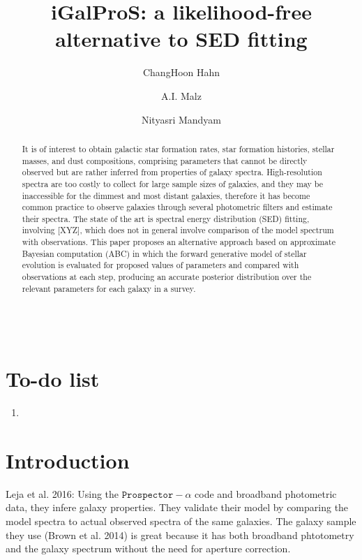 \documentclass[12pt, onecolumn]{emulateapj}
\begin{document}
\begin{align}
\end{align}

\title{iGalProS: a likelihood-free alternative to SED fitting}

\author{ChangHoon Hahn}
\author{A.I. Malz}
\author{Nityasri Mandyam}

\begin{abstract}
It is of interest to obtain galactic star formation rates, star formation histories, stellar masses, and dust compositions, comprising parameters that cannot be directly observed but are rather inferred from properties of galaxy spectra.  High-resolution spectra are too costly to collect for large sample sizes of galaxies, and they may be inaccessible for the dimmest and most distant galaxies, therefore it has become common practice to observe galaxies through several photometric filters and estimate their spectra.  The state of the art is spectral energy distribution (SED) fitting, involving [XYZ], which does not in general involve comparison of the model spectrum with observations.  This paper proposes an alternative approach based on approximate Bayesian computation (ABC) in which the forward generative model of stellar evolution is evaluated for proposed values of parameters and compared with observations at each step, producing an accurate posterior distribution over the relevant parameters for each galaxy in a survey.
\end{abstract}


\section*{To-do list}
\begin{enumerate}
\item
\end{enumerate}

\section{Introduction}
Leja et al. 2016: Using the $\mathtt{Prospector}-\alpha$ code and broadband photometric data, they infere galaxy properties. 
They validate their model by comparing the model spectra to actual observed spectra of the same galaxies. The galaxy sample 
they use (Brown et al. 2014) is great because it has both broadband phtotometry and the galaxy spectrum without the need for
aperture correction. 


\acknowledgments{}

\appendix{}


\end{document}
